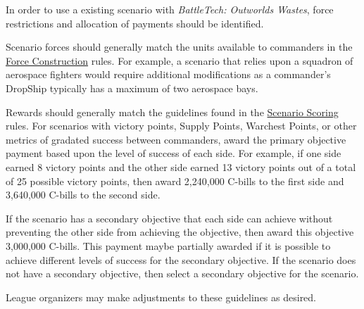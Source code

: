 In order to use a existing scenario with \emph{BattleTech: Outworlds Wastes}, force restrictions and allocation of payments should be identified.

Scenario forces should generally match the units available to commanders in the \hyperref[subsec:force_construction]{Force Construction} rules.
For example, a scenario that relies upon a squadron of aerospace fighters would require additional modifications as a commander's DropShip typically has a maximum of two aerospace bays.

Rewards should generally match the guidelines found in the \hyperref[subsec:scenario_scoring]{Scenario Scoring} rules.
For scenarios with victory points, Supply Points, Warchest Points, or other metrics of gradated success between commanders, award the primary objective payment based upon the level of success of each side.
For example, if one side earned 8 victory points and the other side earned 13 victory points out of a total of 25 possible victory points, then award 2,240,000 C-bills to the first side and 3,640,000 C-bills to the second side.

If the scenario has a secondary objective that each side can achieve without preventing the other side from achieving the objective, then award this objective 3,000,000 C-bills.
This payment maybe partially awarded if it is possible to achieve different levels of success for the secondary objective.
If the scenario does not have a secondary objective, then select a secondary objective for the scenario.

League organizers may make adjustments to these guidelines as desired.
